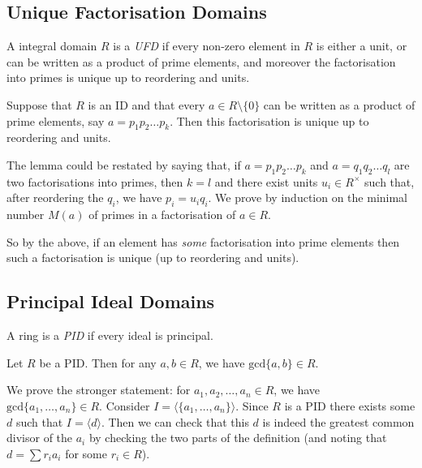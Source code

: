 \documentclass{maths}
\begin{document}
\subsection{Unique Factorisation Domains}

\begin{defn}
    A integral domain $R$ is a \emph{UFD} if every non-zero element in $R$ is either a unit, or can be written as a product of prime elements, and moreover the factorisation into primes is unique up to reordering and units.
\end{defn}

\begin{lem}
    Suppose that $R$ is an ID and that every $a\in R\setminus\{0\}$ can be written as a product of prime elements, say $a=p_1 p_2\ldots p_k$.
    Then this factorisation is unique up to reordering and units.
\end{lem}

\begin{prf}
    The lemma could be restated by saying that, if $a=p_1 p_2\ldots p_k$ and $a=q_1 q_2\ldots q_l$ are two factorisations into primes, then $k=l$ and there exist units $u_i\in R^{\times}$ such that, after reordering the $q_i$, we have $p_i=u_i q_i$.
    We prove by induction on the minimal number $M(a)$ of primes in a factorisation of $a\in R$.
\end{prf}

So by the above, if an element has \emph{some} factorisation into prime elements then such a factorisation is unique (up to reordering and units).

\subsection{Principal Ideal Domains}

\begin{defn}
    A ring is a \emph{PID} if every ideal is principal.
\end{defn}

\begin{lem}
    Let $R$ be a PID.
    Then for any $a,b\in R$, we have $\mathrm{gcd}\{a,b\}\in R$.
\end{lem}

\begin{prf}
    We prove the stronger statement: for $a_1,a_2,\ldots,a_n\in R$, we have $\mathrm{gcd}\{a_1,\ldots,a_n\}\in R$.
    Consider $I=\langle\{a_1,\ldots,a_n\}\rangle$.
    Since $R$ is a PID there exists some $d$ such that $I=\langle d\rangle$.
    Then we can check that this $d$ is indeed the greatest common divisor of the $a_i$ by checking the two parts of the definition (and noting that $d=\sum r_i a_i$ for some $r_i\in R$).
\end{prf}
\end{document}
